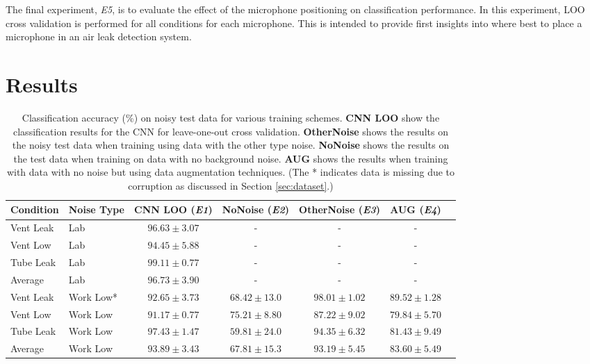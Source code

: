 The final experiment, \textit{E5}, is to evaluate the effect of the microphone positioning on classification performance. In this experiment, LOO cross validation is performed for all conditions for each microphone. This is intended to provide first insights into where best to place a microphone in an air leak detection system.

\section{Results}\label{sec:res}

\begin{table}[h]
    \centering
    \caption{Classification accuracy (\%) on noisy test data for various training schemes. \textbf{CNN LOO} show the classification results for the CNN for leave-one-out cross validation. \textbf{OtherNoise} shows the results on the noisy test data when training using data with the other type noise. \textbf{NoNoise} shows the results on the test data when training on data with no background noise. \textbf{AUG} shows the results when training with data with no noise but using data augmentation techniques. (The * indicates data is missing due to corruption as discussed in Section \ref{sec:dataset}.)}
    \begin{tabular}{l l c c c c c}
    \toprule
    Condition & Noise Type & CNN LOO (\textit{E1}) & NoNoise (\textit{E2}) & OtherNoise (\textit{E3}) & AUG (\textit{E4}) \\ \midrule
    
    Vent Leak & Lab & $96.63\pm3.07$ & - & - & - \\
    Vent Low  & Lab & $94.45\pm5.88$ & - & - & -  \\ 
    Tube Leak & Lab & $99.11\pm0.77$ & - & - & -  \\ \midrule
    Average   & Lab & $96.73\pm3.90$ & - & - & -  \\ \midrule
    
    Vent Leak & Work Low* & $92.65\pm3.73$ & $68.42\pm13.0$ & $98.01\pm1.02$ & $89.52\pm1.28$ \\
    Vent Low  & Work Low  & $91.17\pm0.77$ & $75.21\pm8.80$ & $87.22\pm9.02$ & $79.84\pm5.70$ \\
    Tube Leak & Work Low  & $97.43\pm1.47$ & $59.81\pm24.0$ & $94.35\pm6.32$ & $81.43\pm9.49$ \\ \midrule
    Average   & Work Low  & $93.89\pm3.43$ & $67.81\pm15.3$ & $93.19\pm5.45$ & $83.60\pm5.49$ \\ \midrule
    

\end{tabular}
\end{table}
